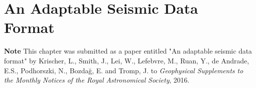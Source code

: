 \chapter{An Adaptable Seismic Data Format\label{ch:asdf}}

\textbf{Note}\newline
This chapter was submitted as a paper entitled "An adaptable seismic data format"
by Krischer, L., Smith, J., Lei, W., Lefebvre, M., Ruan, Y., de Andrade, E.S.,
Podhorszki, N., Bozdağ, E. and Tromp, J. to
\textit{Geophysical Supplements to the Monthly Notices of the Royal Astronomical Society},
2016.









